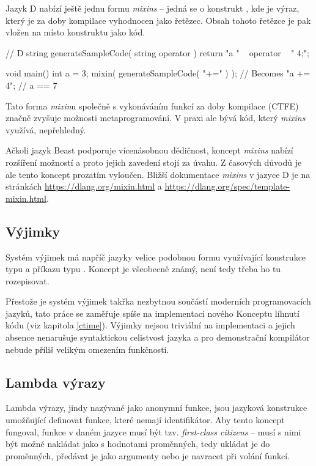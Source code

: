Jazyk D nabízí ještě jednu formu \textit{mixins} -- jedná se o konstrukt , kde  je výraz, který je za doby kompilace vyhodnocen jako řetězec. Obsah tohoto řetězce je pak vložen na místo konstruktu jako kód.

\begin{dcode}
// D
string generateSampleCode( string operator ) {
	return "a " ~ operator ~ " 4;";
}

void main() {
	int a = 3;
	mixin( generateSampleCode( "+=" ) ); // Becomes "a += 4";
	// a == 7
}
\end{dcode}

Tato forma \textit{mixin}u společně s vykonáváním funkcí za doby kompilace (CTFE) značně zvyšuje možnosti metaprogramování. V praxi ale bývá kód, který \textit{mixins} využívá, nepřehledný.

Ačkoli jazyk Beast podporuje vícenásobnou dědičnost, koncept \textit{mixins} nabízí rozšíření možností a proto jejich zavedení stojí za úvahu. Z časových důvodů je ale tento koncept prozatím vyloučen. Bližší dokumentace \textit{mixins} v jazyce D je na stránkách \url{https://dlang.org/mixin.html} a \url{https://dlang.org/spec/template-mixin.html}.

\subsection{Výjimky}
Systém výjimek má napříč jazyky velice podobnou formu využívající konstrukce typu  a příkazu typu . Koncept je všeobecně známý, není tedy třeba ho tu rozepisovat.

Přestože je systém výjimek takřka nezbytnou součástí moderních programovacích jazyků, tato práce se zaměřuje spíše na implementaci nového Konceptu líhnutí kódu (viz kapitola \ref{ctime}). Výjimky nejsou triviální na implementaci a jejich absence nenarušuje syntaktickou celistvost jazyka a pro demonstrační kompilátor nebude příliš velikým omezením funkčnosti.

\subsection{Lambda výrazy}
Lambda výrazy, jindy nazývané jako anonymní funkce, jsou jazyková konstrukce umožňující definovat funkce, které nemají identifikátor. Aby tento koncept fungoval, funkce v daném jazyce musí být tzv. \textit{first-class citizens} -- musí s nimi být možné nakládat jako s hodnotami proměnných, tedy ukládat je do proměnných, předávat je jako argumenty nebo je navracet při volání funkcí.

